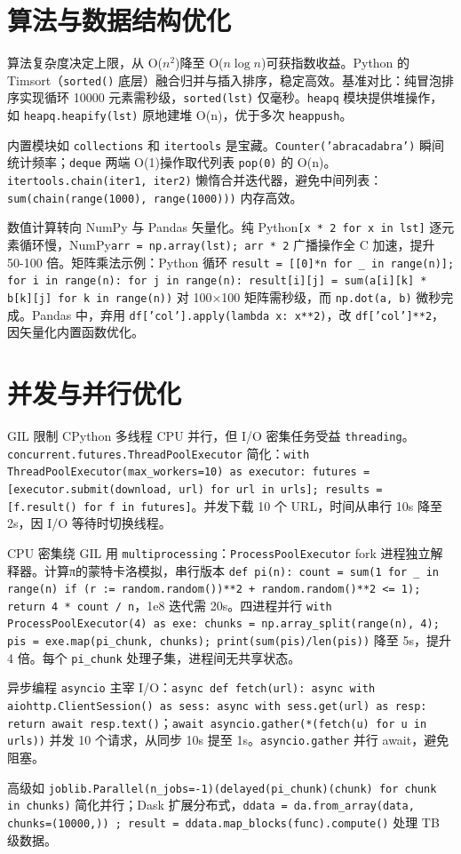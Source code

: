 \chapter{算法与数据结构优化}
算法复杂度决定上限，从 O($n^2$)降至 O($n \log n$)可获指数收益。Python 的 Timsort（\texttt{sorted()} 底层）融合归并与插入排序，稳定高效。基准对比：纯冒泡排序实现循环 10000 元素需秒级，\texttt{sorted(lst)} 仅毫秒。\texttt{heapq} 模块提供堆操作，如 \texttt{heapq.heapify(lst)} 原地建堆 O(n)，优于多次 \texttt{heappush}。\par
内置模块如 \texttt{collections} 和 \texttt{itertools} 是宝藏。\texttt{Counter('abracadabra')} 瞬间统计频率；\texttt{deque} 两端 O(1)操作取代列表 \texttt{pop(0)} 的 O(n)。\texttt{itertools.chain(iter1, iter2)} 懒惰合并迭代器，避免中间列表：\texttt{sum(chain(range(1000), range(1000)))} 内存高效。\par
数值计算转向 NumPy 与 Pandas 矢量化。纯 Python\texttt{[x * 2 for x in lst]} 逐元素循环慢，NumPy\texttt{arr = np.array(lst); arr * 2} 广播操作全 C 加速，提升 50-100 倍。矩阵乘法示例：Python 循环 \texttt{result = [[0]*n for \_{} in range(n)]; for i in range(n): for j in range(n): result[i][j] = sum(a[i][k] * b[k][j] for k in range(n))} 对 100×100 矩阵需秒级，而 \texttt{np.dot(a, b)} 微秒完成。Pandas 中，弃用 \texttt{df['col'].apply(lambda x: x**2)}，改 \texttt{df['col']**2}，因矢量化内置函数优化。\par
\chapter{并发与并行优化}
GIL 限制 CPython 多线程 CPU 并行，但 I/O 密集任务受益 \texttt{threading}。\texttt{concurrent.futures.ThreadPoolExecutor} 简化：\texttt{with ThreadPoolExecutor(max\_{}workers=10) as executor: futures = [executor.submit(download, url) for url in urls]; results = [f.result() for f in futures]}。并发下载 10 个 URL，时间从串行 10s 降至 2s，因 I/O 等待时切换线程。\par
CPU 密集绕 GIL 用 \texttt{multiprocessing}：\texttt{ProcessPoolExecutor} fork 进程独立解释器。计算π的蒙特卡洛模拟，串行版本 \texttt{def pi(n): count = sum(1 for \_{} in range(n) if (r := random.random())**2 + random.random()**2 <= 1); return 4 * count / n}，1e8 迭代需 20s。四进程并行 \texttt{with ProcessPoolExecutor(4) as exe: chunks = np.array\_{}split(range(n), 4); pis = exe.map(pi\_{}chunk, chunks); print(sum(pis)/len(pis))} 降至 5s，提升 4 倍。每个 \texttt{pi\_{}chunk} 处理子集，进程间无共享状态。\par
异步编程 \texttt{asyncio} 主宰 I/O：\texttt{async def fetch(url): async with aiohttp.ClientSession() as sess: async with sess.get(url) as resp: return await resp.text()}；\texttt{await asyncio.gather(*(fetch(u) for u in urls))} 并发 10 个请求，从同步 10s 提至 1s。\texttt{asyncio.gather} 并行 await，避免阻塞。\par
高级如 \texttt{joblib.Parallel(n\_{}jobs=-1)(delayed(pi\_{}chunk)(chunk) for chunk in chunks)} 简化并行；Dask 扩展分布式，\texttt{ddata = da.from\_{}array(data, chunks=(10000,)) ; result = ddata.map\_{}blocks(func).compute()} 处理 TB 级数据。\par
